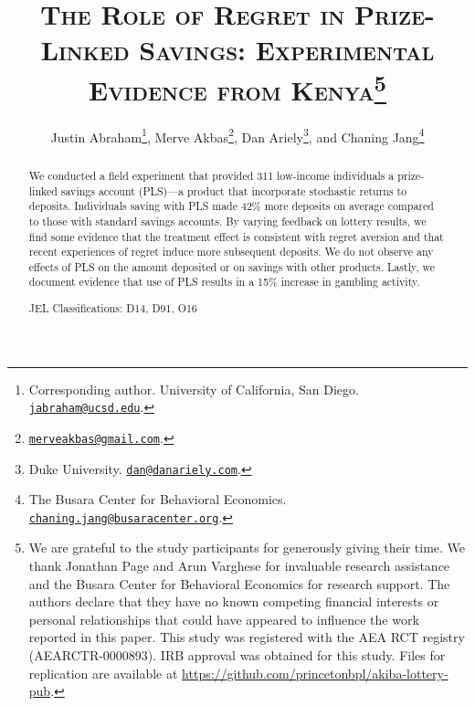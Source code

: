 \documentclass[12pt]{article}
\begin{document}
\title{\textsc{The Role of Regret in Prize-Linked Savings: Experimental Evidence from Kenya}\protect\footnote{We are grateful to the study participants for generously giving their time. We thank Jonathan Page and Arun Varghese for invaluable research assistance and the Busara Center for Behavioral Economics for research support. The authors declare that they have no known competing financial interests or personal relationships that could have appeared to influence the work reported in this paper. This study was registered with the AEA RCT registry (AEARCTR-0000893). IRB approval was obtained for this study. Files for replication are available at \url{https://github.com/princetonbpl/akiba-lottery-pub}.}}

\author{
    Justin Abraham\thanks{Corresponding author. University of California, San Diego. \protect\href{mailto:jabraham@ucsd.edu}{\nolinkurl{jabraham@ucsd.edu}}.},
    Merve Akbas\thanks{\protect\href{mailto:merveakbas@gmail.com}{\nolinkurl{merveakbas@gmail.com}}.},
    Dan Ariely\thanks{Duke University. \protect\href{mailto:dan@danariely.com}{\nolinkurl{dan@danariely.com}}.}, and
    Chaning Jang\thanks{The Busara Center for Behavioral Economics. \protect\href{mailto:chaning.jang@busaracenter.org}{\nolinkurl{chaning.jang@busaracenter.org}}.}
}

\maketitle

	\begin{abstract}

		We conducted a field experiment that provided 311 low-income individuals a prize-linked savings account (PLS)---a product that incorporate stochastic returns to deposits. Individuals saving with PLS made 42\% more deposits on average compared to those with standard savings accounts. By varying feedback on lottery results, we find some evidence that the treatment effect is consistent with regret aversion and that recent experiences of regret induce more subsequent deposits. We do not observe any effects of PLS on the amount deposited or on savings with other products. Lastly, we document evidence that use of PLS results in a 15\% increase in gambling activity.

		\medskip \noindent
		JEL Classifications: D14, D91, O16

 	\end{abstract}

\newpage
\end{document}
